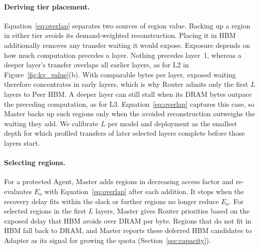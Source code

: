 \paragraph{Deriving tier placement.}
Equation~\ref{eq:overlap} separates two sources of region value. Backing
up a region in either tier avoids its demand-weighted reconstruction.
Placing it in HBM additionally removes any transfer waiting it would
expose. Exposure depends on how much computation precedes a layer.
Nothing precedes layer~1, whereas a deeper layer's transfer overlaps all
earlier layers, as for L2 in Figure~\ref{fig:kv_value}(b). With comparable
bytes per layer, exposed waiting therefore concentrates in early layers,
which is why Router admits only the first $L$ layers to Peer HBM. A deeper
layer can still stall when its DRAM bytes outpace the preceding
computation, as for L3. Equation~\ref{eq:overlap} captures this case, so
Master backs up such regions only when the avoided reconstruction
outweighs the waiting they add. We calibrate $L$ per model and
deployment as the smallest depth for which profiled transfers of later
selected layers complete before those layers start.

\paragraph{Selecting regions.}
For a protected Agent, Master adds regions in decreasing access factor
and re-evaluates $E_a$ with Equation~\ref{eq:overlap} after each
addition. It stops when the recovery delay fits within the slack or
further regions no longer reduce $E_a$. For selected regions in the
first $L$ layers, Master gives Router priorities based on the exposed
delay that HBM avoids over DRAM per byte. Regions that do not fit in HBM
fall back to DRAM, and Master reports these deferred HBM candidates to
Adapter as its signal for growing the quota (Section~\ref{sec:capacity}).

